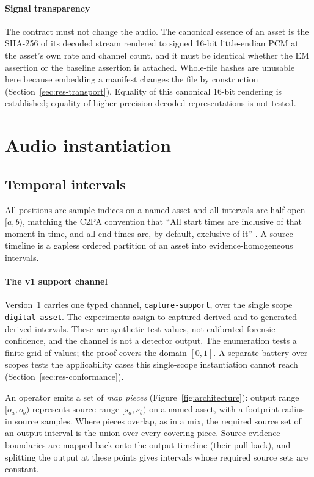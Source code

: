 \documentclass[preprint,3p,11pt,authoryear]{elsarticle}
\begin{document}
\paragraph{Signal transparency} The contract must not change the audio.
The canonical essence of an asset is the SHA-256 of its decoded stream rendered
to signed 16-bit little-endian PCM at the asset's own rate and channel count,
and it must be identical whether the EM assertion or the baseline assertion is
attached. Whole-file hashes are unusable here because embedding a manifest
changes the file by construction (Section~\ref{sec:res-transport}). Equality
of this canonical 16-bit rendering is established; equality of higher-precision
decoded representations is not tested.

\section{Audio instantiation}
\label{sec:audio}

\subsection{Temporal intervals}

All positions are sample indices on a named asset and all intervals are
half-open $[a,b)$, matching the C2PA convention that ``All start times are
inclusive of that moment in time, and all end times are, by default, exclusive
of it'' \citep[\S18.2.2.3]{c2pa24}. A source timeline is a gapless ordered
partition of an asset into evidence-homogeneous intervals.

\paragraph{The v1 support channel} Version~1 carries one typed channel,
\texttt{capture-support}, over the single scope \texttt{digital-asset}. The
experiments assign \CaptSupport{} to captured-derived and \GenSupport{} to
generated-derived intervals. These are synthetic test values, not calibrated
forensic confidence, and the channel is not a detector output. The enumeration
tests a finite grid of values; the proof covers the domain $[0,1]$. A separate
battery over \LscopeScopes{} scopes tests the applicability cases this
single-scope instantiation cannot reach (Section~\ref{sec:res-conformance}).

An operator emits a set of \emph{map pieces} (Figure~\ref{fig:architecture}): output range $[o_a, o_b)$
represents source range $[s_a, s_b)$ on a named asset, with a footprint radius
in source samples. Where pieces overlap, as in a mix, the required source set of
an output interval is the union over every covering piece. Source evidence
boundaries are mapped back onto the output timeline (their pull-back), and
splitting the output at these points gives intervals whose required source sets
are constant.
\end{document}
